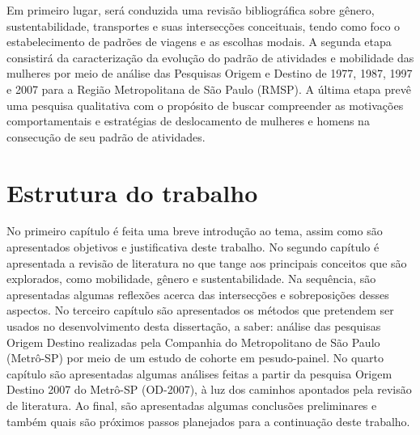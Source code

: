 Em primeiro lugar, será conduzida uma revisão bibliográfica sobre gênero, sustentabilidade, transportes e suas intersecções conceituais, tendo como foco o estabelecimento de padrões de viagens e as escolhas modais.
A segunda etapa consistirá da caracterização da evolução do padrão de atividades e mobilidade das mulheres por meio de análise das Pesquisas Origem e Destino de 1977, 1987, 1997 e 2007 para a Região Metropolitana de São Paulo (RMSP).
A última etapa prevê uma pesquisa qualitativa com o propósito de buscar compreender as motivações comportamentais e estratégias de deslocamento de mulheres e homens na consecução de seu padrão de atividades.

\section{Estrutura do trabalho}

No primeiro capítulo é feita uma breve introdução ao tema, assim como são apresentados objetivos e justificativa deste trabalho.
No segundo capítulo é apresentada a revisão de literatura no que tange aos principais conceitos que são explorados, como mobilidade, gênero e sustentabilidade. Na sequência, são apresentadas algumas reflexões acerca das intersecções e sobreposições desses aspectos.
No terceiro capítulo são apresentados os métodos que pretendem ser usados no desenvolvimento desta dissertação, a saber: análise das pesquisas Origem Destino realizadas pela Companhia do Metropolitano de São Paulo (Metrô-SP) por meio de um estudo de cohorte em pesudo-painel.
No quarto capítulo são apresentadas algumas análises feitas a partir da pesquisa Origem Destino 2007 do Metrô-SP (OD-2007), à luz dos caminhos apontados pela revisão de literatura.
Ao final, são apresentadas algumas conclusões preliminares e também quais são próximos passos planejados para a continuação deste trabalho.
